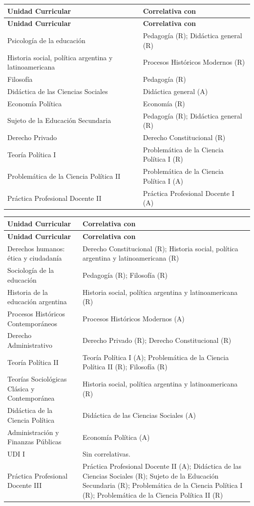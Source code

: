 ﻿%
\thispagestyle{empty}

\begingroup
\footnotesize
\setlength{\tabcolsep}{2.4pt}
\renewcommand{\arraystretch}{1.08}
\setlength{\LTleft}{0.10\textwidth}
\setlength{\LTright}{0.10\textwidth}
\setlength{\LTpre}{0.08em}
\setlength{\LTpost}{0.2em}

\newcommand{\CPTableStart}{
\begin{longtable}{|>{\RaggedRight\arraybackslash}p{0.24\textwidth}|>{\RaggedRight\arraybackslash}p{0.51\textwidth}|}
\hline
\textbf{Unidad Curricular} & \textbf{Correlativa con} \\
\hline
\endfirsthead
\hline
\textbf{Unidad Curricular} & \textbf{Correlativa con} \\
\hline
\endhead
}

\newcommand{\CPTableEnd}{
\end{longtable}
}

\newcommand{\CPRow}[2]{
\rule{0pt}{2.08ex}#1 & #2 \\
\hline
}

\CPTableStart
\CPRow{Psicología de la educación}{Pedagogía (R); Didáctica general (R)}
\CPRow{Historia social, política argentina y latinoamericana}{Procesos Históricos Modernos (R)}
\CPRow{Filosofía}{Pedagogía (R)}
\CPRow{Didáctica de las Ciencias Sociales}{Didáctica general (A)}
\CPRow{Economía Política}{Economía (R)}
\CPRow{Sujeto de la Educación Secundaria}{Pedagogía (R); Didáctica general (R)}
\CPRow{Derecho Privado}{Derecho Constitucional (R)}
\CPRow{Teoría Política I}{Problemática de la Ciencia Política I (R)}
\CPRow{Problemática de la Ciencia Política II}{Problemática de la Ciencia Política I (A)}
\CPRow{Práctica Profesional Docente II}{Práctica Profesional Docente I (A)}
\CPTableEnd

\CPTableStart
\CPRow{Derechos humanos: ética y ciudadanía}{Derecho Constitucional (R); Historia social, política argentina y latinoamericana (R)}
\CPRow{Sociología de la educación}{Pedagogía (R); Filosofía (R)}
\CPRow{Historia de la educación argentina}{Historia social, política argentina y latinoamericana (R)}
\CPRow{Procesos Históricos Contemporáneos}{Procesos Históricos Modernos (A)}
\CPRow{Derecho Administrativo}{Derecho Privado (R); Derecho Constitucional (R)}
\CPRow{Teoría Política II}{Teoría Política I (A); Problemática de la Ciencia Política II (R); Filosofía (R)}
\CPRow{Teorías Sociológicas Clásica y Contemporánea}{Historia social, política argentina y latinoamericana (R)}
\CPRow{Didáctica de la Ciencia Política}{Didáctica de las Ciencias Sociales (A)}
\CPRow{Administración y Finanzas Públicas}{Economía Política (A)}
\CPRow{UDI I}{Sin correlativas.}
\CPRow{Práctica Profesional Docente III}{Práctica Profesional Docente II (A); Didáctica de las Ciencias Sociales (R); Sujeto de la Educación Secundaria (R); Problemática de la Ciencia Política I (R); Problemática de la Ciencia Política II (R)}
\CPTableEnd

